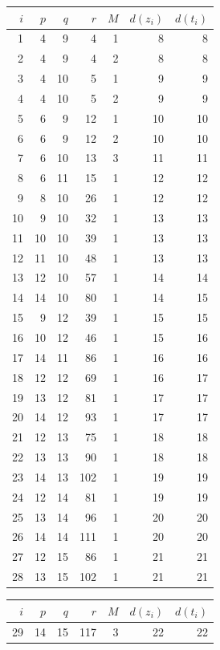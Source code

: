 \documentclass[11pt,a4paper]{article}
\theoremstyle{definition}
\theoremstyle{remark}
\begin{document}
\begin{center}\scriptsize\setlength{\tabcolsep}{2.5pt}
\begin{tabular}{@{}rrrrrrr@{}}
\toprule
$i$ & $p$ & $q$ & $r$ & $M$ & $d(z_i)$ & $d(t_i)$ \\
\midrule
1 & 4 & 9 & 4 & 1 & 8 & 8 \\
2 & 4 & 9 & 4 & 2 & 8 & 8 \\
3 & 4 & 10 & 5 & 1 & 9 & 9 \\
4 & 4 & 10 & 5 & 2 & 9 & 9 \\
5 & 6 & 9 & 12 & 1 & 10 & 10 \\
6 & 6 & 9 & 12 & 2 & 10 & 10 \\
7 & 6 & 10 & 13 & 3 & 11 & 11 \\
8 & 6 & 11 & 15 & 1 & 12 & 12 \\
9 & 8 & 10 & 26 & 1 & 12 & 12 \\
10 & 9 & 10 & 32 & 1 & 13 & 13 \\
11 & 10 & 10 & 39 & 1 & 13 & 13 \\
12 & 11 & 10 & 48 & 1 & 13 & 13 \\
13 & 12 & 10 & 57 & 1 & 14 & 14 \\
14 & 14 & 10 & 80 & 1 & 14 & 15 \\
15 & 9 & 12 & 39 & 1 & 15 & 15 \\
16 & 10 & 12 & 46 & 1 & 15 & 16 \\
17 & 14 & 11 & 86 & 1 & 16 & 16 \\
18 & 12 & 12 & 69 & 1 & 16 & 17 \\
19 & 13 & 12 & 81 & 1 & 17 & 17 \\
20 & 14 & 12 & 93 & 1 & 17 & 17 \\
21 & 12 & 13 & 75 & 1 & 18 & 18 \\
22 & 13 & 13 & 90 & 1 & 18 & 18 \\
23 & 14 & 13 & 102 & 1 & 19 & 19 \\
24 & 12 & 14 & 81 & 1 & 19 & 19 \\
25 & 13 & 14 & 96 & 1 & 20 & 20 \\
26 & 14 & 14 & 111 & 1 & 20 & 20 \\
27 & 12 & 15 & 86 & 1 & 21 & 21 \\
28 & 13 & 15 & 102 & 1 & 21 & 21 \\
\bottomrule
\end{tabular}\hfill
\begin{tabular}{@{}rrrrrrr@{}}
\toprule
$i$ & $p$ & $q$ & $r$ & $M$ & $d(z_i)$ & $d(t_i)$ \\
\midrule
29 & 14 & 15 & 117 & 3 & 22 & 22 \\

\end{tabular}
\end{center}
\end{document}
